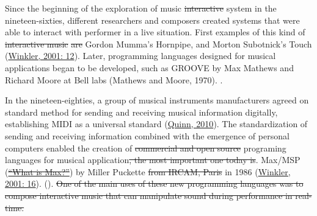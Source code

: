 Since the beginning of the exploration  of  music \st{interactive} system in the nineteen-sixties, different researchers and composers created systems that were able to interact with performer in a live situation. First examples of this kind of \st{interactive music} \st{are}   Gordon Mumma's Hornpipe, and Morton Subotnick's Touch (\href{http://blog.lib.umn.edu/geers001/emusic/14_assig_ComposingInteractiveMusicCh1-2.pdf}{Winkler, 2001: 12}). Later, programming languages designed for musical applications began to be developed, such as GROOVE by Max Mathews and Richard Moore at Bell labs (Mathews and Moore, 1970). .

In the nineteen-eighties, a group of musical instruments manufacturers agreed on standard method for sending and receiving musical information digitally, establishing MIDI  as a universal standard (\href{http://www.insidetechnology360.com/index.php/the-history-of-midi-8862/}{Quinn, 2010}). The standardization of sending and receiving information combined with the emergence of personal computers enabled the creation of \st{commercial and open source}  programing languages for musical application\st{, the most important one today is}. Max/MSP (\href{http://cycling74.com/whatismax/}{\st{``What is Max?''}})  by Miller Puckette \st{from IRCAM, Paris} in 1986  (\href{http://blog.lib.umn.edu/geers001/emusic/14_assig_ComposingInteractiveMusicCh1-2.pdf}{Winkler, 2001: 16}).  ().\st{ One of the main uses of these new programming languages was to compose interactive music that can manipulate sound during performance in real-time.}

